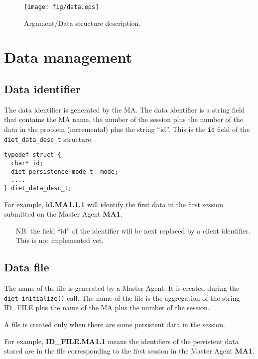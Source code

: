 \begin{figure}[hpt]
 \begin{center}
  \texttt{[image: fig/data.eps]}
  \caption{Argument/Data structure description.}
  \label{fig:data}
 \end{center}
\end{figure}


\section{Data management}
\label{sec:datamgt}

\subsection{Data identifier}
\label{ssec:dataid}
The data identifier is generated by the MA. The data identifier is a
string field that contains the MA name, the number of the session plus
the number of the data in the problem (incremental) plus the string
``id''.  This is the \texttt{id} field of the
\texttt{diet\_data\_desc\_t} structure.

{\footnotesize
\begin{verbatim}
typedef struct {
  char* id;  
  diet_persistence_mode_t  mode;
  ....
} diet_data_desc_t;
\end{verbatim}
}

For example, \textbf{id.MA1.1.1} will identify the first data
in the first session submitted on the Master Agent \textbf{MA1}.


\begin{itemize}
\item[NB:] the field ``id'' of the identifier will be next replaced by a
client identifier. This is not implemented yet.
\end{itemize}

\subsection{Data file}
\label{ssec:datafile}

The name of the file is generated by a Master Agent. It is created
during the \texttt{diet\_initialize()} call. The name of the file is
the aggregation of the string ID\_FILE plus the name of the MA plus
the number of the session.  

A file is created only when there are some persistent data in the
session.  

For example, \textbf{ID\_FILE.MA1.1} means the identifiers
of the persistent data stored are in the file corresponding to the
first session in the Master Agent \textbf{MA1}.

